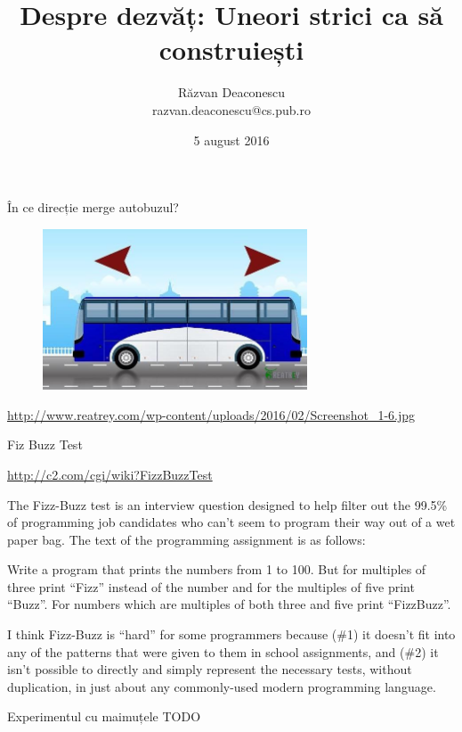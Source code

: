 \documentclass{beamer}
\title[Despre dezvăț]{Despre dezvăț: Uneori strici ca să construiești}
\institute{Info Educație 2016 (Gălăciuc, Vrancea)}
\author[Răzvan Deaconescu]{Răzvan Deaconescu \\
razvan.deaconescu@cs.pub.ro}
\date{5 august 2016}
\begin{document}
\frame{\titlepage}

\begin{frame}{În ce direcție merge autobuzul?}
  \begin{figure}
    \centering
    \includegraphics[width=0.7\textwidth]{img/bus-direction}
  \end{figure}
  \begin{center}
    \scriptsize
    \url{http://www.reatrey.com/wp-content/uploads/2016/02/Screenshot_1-6.jpg}
  \end{center}
\end{frame}

\begin{frame}{Fiz Buzz Test}
  \begin{center}
    \scriptsize
    \url{http://c2.com/cgi/wiki?FizzBuzzTest}
  \end{center}
The Fizz-Buzz test is an interview question designed to help filter out the 99.5\% of programming job candidates who can't seem to program their way out of a wet paper bag. The text of the programming assignment is as follows:

    Write a program that prints the numbers from 1 to 100. But for multiples of three print ``Fizz'' instead of the number and for the multiples of five print ``Buzz''. For numbers which are multiples of both three and five print ``FizzBuzz''.

I think Fizz-Buzz is ``hard'' for some programmers because (\#1) it doesn't fit into any of the patterns that were given to them in school assignments, and (\#2) it isn't possible to directly and simply represent the necessary tests, without duplication, in just about any commonly-used modern programming language.
\end{frame}

\begin{frame}{Experimentul cu maimuțele}
  TODO
\end{frame}
\end{document}
